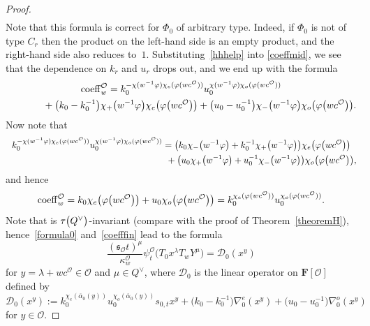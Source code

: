 \begin{proof}
\begin{gather*}
\end{gather*}
Note that this formula is correct for $\Phi_0$ of arbitrary type. Indeed, if $\Phi_0$ is not of type $C_r$ then the product on the left-hand side is an empty product, and the right-hand side also reduces to~$1$.
Substituting~\eqref{hhhelp} into
\eqref{coeffmid}, we see that
the dependence on $k_r$ and $u_r$ drops out, and we end up with the formula
\begin{gather*}
{\rm coeff}_w^\mathcal{O}=k_0^{-\chi(w^{-1}\varphi)\chi_e(\varphi(wc^\mathcal{O}))}
u_0^{\chi(w^{-1}\varphi)\chi_o(\varphi(wc^\mathcal{O}))}\\
\hphantom{{\rm coeff}_w^\mathcal{O}=}{}
+\bigl(k_0-k_0^{-1}\bigr)\chi_+\bigl(w^{-1}\varphi\bigr)\chi_e\bigl(\varphi\bigl(wc^\mathcal{O}\bigr)\bigr)+
\bigl(u_0-u_0^{-1}\bigr)\chi_-\bigl(w^{-1}\varphi\bigr)\chi_o\bigl(\varphi\bigl(wc^\mathcal{O}\bigr)\bigr).
\end{gather*}
Now note that
\begin{gather*}
k_0^{-\chi(w^{-1}\varphi)\chi_e(\varphi(wc^\mathcal{O}))}
u_0^{\chi(w^{-1}\varphi)\chi_o(\varphi(wc^\mathcal{O}))}=\bigl(k_0\chi_-\bigl(w^{-1}\varphi\bigr)+k_0^{-1}\chi_+\bigl(w^{-1}\varphi\bigr)\bigr)\chi_e \bigl(\varphi\bigl(wc^\mathcal{O}\bigr)\bigr)\\
\hphantom{k_0^{-\chi(w^{-1}\varphi)\chi_e(\varphi(wc^\mathcal{O}))}
u_0^{\chi(w^{-1}\varphi)\chi_o(\varphi(wc^\mathcal{O}))}=}{}
+\bigl(u_0\chi_+\bigl(w^{-1}\varphi\bigr)+u_0^{-1}\chi_-\bigl(w^{-1}\varphi\bigr)\bigr)\chi_o\bigl(\varphi\bigl(wc^\mathcal{O}\bigr)\bigr),
\end{gather*}
and hence
\begin{equation}\label{coefffin}
{\rm coeff}_w^\mathcal{O}=k_0\chi_e\bigl(\varphi\bigl(wc^\mathcal{O}\bigr)\bigr)+u_0\chi_o\bigl(\varphi\bigl(wc^\mathcal{O}\bigr)\bigr)=
k_0^{\chi_e(\varphi(wc^\mathcal{O}))}u_0^{\chi_o(\varphi(wc^\mathcal{O}))}.
\end{equation}
Note that  is $\tau\smash{\bigl(Q^\vee\bigr)}$-invariant (compare with the proof of Theorem~\ref{theoremH}),
hence~\eqref{formula0} and~\eqref{coefffin} lead to the formula
\begin{equation*}
\frac{(\mathfrak{s}_\mathcal{O}t)^\mu}{\kappa_w^\mathcal{O}}\psi_{t}^\mathcal{O}\bigl(T_0x^\lambda T_wY^\mu\bigr)=\mathcal{D}_0(x^y)
\end{equation*}
for $y=\lambda+wc^\mathcal{O}\in\mathcal{O}$ and $\mu\in Q^\vee$, where $\mathcal{D}_0$ is the linear operator on $\mathbf{F}[\mathcal{O}]$ defined by
\[
\mathcal{D}_0(x^y):=
k_0^{\chi_e(\overline{\alpha}_0(y))}u_0^{\chi_o(\overline{\alpha}_0(y))}s_{0,t}x^y+\bigl(k_0-k_0^{-1}\bigr)\nabla_0^e(x^y)+\bigl(u_0-u_0^{-1}\bigr)\nabla_0^o(x^y)
\]
for $y\in\mathcal{O}$.


\end{proof}
